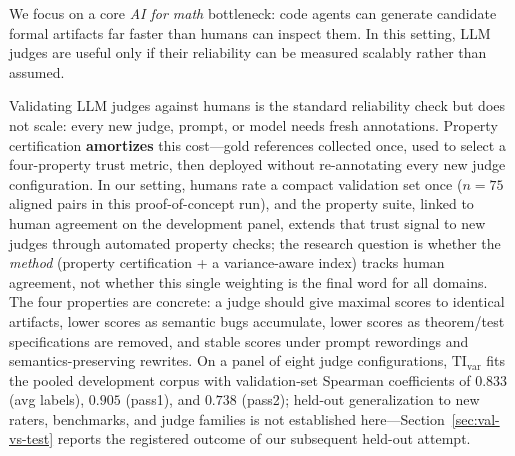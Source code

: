 \documentclass{article}
\begin{document}
We focus on a core \emph{AI for math} bottleneck: code agents can generate candidate formal artifacts far faster than humans can inspect them. In this setting, LLM judges are useful only if their reliability can be measured scalably rather than assumed.

Validating LLM judges against humans is the standard reliability check but does not scale: every new judge, prompt, or model needs fresh annotations.
Property certification \textbf{amortizes} this cost---gold references collected once, used to select a four-property trust metric, then deployed without re-annotating every new judge configuration.
In our setting, humans rate a compact validation set once (\(n {=} 75\) aligned pairs in this proof-of-concept run), and the property suite, linked to human agreement on the development panel, extends that trust signal to new judges through automated property checks; the research question is whether the \emph{method} (property certification + a variance-aware index) tracks human agreement, not whether this single weighting is the final word for all domains.
The four properties are concrete: a judge should give maximal scores to identical artifacts, lower scores as semantic bugs accumulate, lower scores as theorem/test specifications are removed, and stable scores under prompt rewordings and semantics-preserving rewrites.
On a panel of eight judge configurations, \(\mathrm{TI}_{\mathrm{var}}\) fits the pooled development corpus with validation-set Spearman coefficients of \(0.833\) (avg labels), \(0.905\) (pass1), and \(0.738\) (pass2); held-out generalization to new raters, benchmarks, and judge families is not established here---Section~\ref{sec:val-vs-test} reports the registered outcome of our subsequent held-out attempt.
\end{document}

